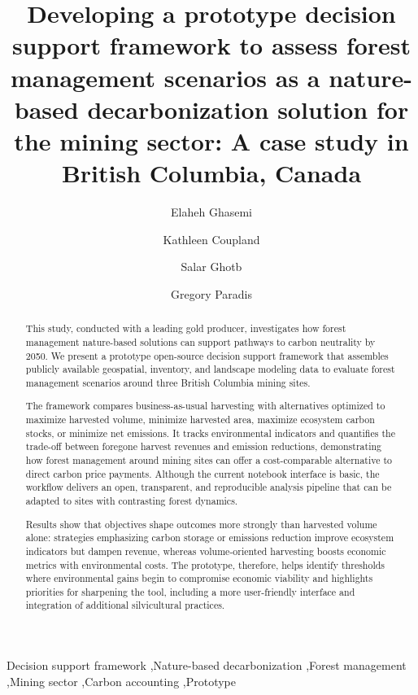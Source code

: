 \documentclass[preprint,12pt]{elsarticle}
\begin{document}
\begin{frontmatter}

\title{Developing a prototype decision support framework to assess forest management scenarios as a nature-based decarbonization solution for the mining sector: A case study in British Columbia, Canada}

\author[1]{Elaheh Ghasemi}
\author[1]{Kathleen Coupland}
\author[1]{Salar Ghotb}
\author[1]{Gregory Paradis}

\address[1]{Faculty of Forestry, University of British Columbia, 2424 Main Mall, Vancouver, BC V6T 1Z4, Canada}


\begin{abstract}
This study, conducted with a leading gold producer, investigates how forest management nature-based solutions can support pathways to carbon neutrality by 2050. We present a prototype open-source decision support framework that assembles publicly available geospatial, inventory, and landscape modeling data to evaluate forest management scenarios around three British Columbia mining sites.

The framework compares business-as-usual harvesting with alternatives optimized to maximize harvested volume, minimize harvested area, maximize ecosystem carbon stocks, or minimize net emissions. It tracks environmental indicators and quantifies the trade-off between foregone harvest revenues and emission reductions, demonstrating how forest management around mining sites can offer a cost-comparable alternative to direct carbon price payments. Although the current notebook interface is basic, the workflow delivers an open, transparent, and reproducible analysis pipeline that can be adapted to sites with contrasting forest dynamics.

Results show that objectives shape outcomes more strongly than harvested volume alone: strategies emphasizing carbon storage or emissions reduction improve ecosystem indicators but dampen revenue, whereas volume-oriented harvesting boosts economic metrics with environmental costs. The prototype, therefore, helps identify thresholds where environmental gains begin to compromise economic viability and highlights priorities for sharpening the tool, including a more user-friendly interface and integration of additional silvicultural practices.
\end{abstract}

\modulolinenumbers[5]

\begin{keyword}
Decision support framework \sep Nature-based decarbonization \sep Forest management \sep Mining sector \sep Carbon accounting \sep Prototype
\end{keyword}

\end{frontmatter}
\linenumbers
\end{document}
